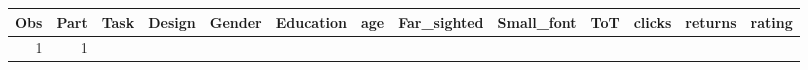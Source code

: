 \documentclass[]{svmono}
\theoremstyle{definition}
\theoremstyle{definition}
\theoremstyle{definition}
\theoremstyle{remark}
\begin{document}
\begin{longtable}[]{@{}rrllllrllrrrr@{}}
\toprule
\begin{minipage}[b]{0.03\columnwidth}\raggedleft\strut
Obs\strut
\end{minipage} & \begin{minipage}[b]{0.04\columnwidth}\raggedleft\strut
Part\strut
\end{minipage} & \begin{minipage}[b]{0.04\columnwidth}\raggedright\strut
Task\strut
\end{minipage} & \begin{minipage}[b]{0.05\columnwidth}\raggedright\strut
Design\strut
\end{minipage} & \begin{minipage}[b]{0.05\columnwidth}\raggedright\strut
Gender\strut
\end{minipage} & \begin{minipage}[b]{0.07\columnwidth}\raggedright\strut
Education\strut
\end{minipage} & \begin{minipage}[b]{0.03\columnwidth}\raggedleft\strut
age\strut
\end{minipage} & \begin{minipage}[b]{0.08\columnwidth}\raggedright\strut
Far\_sighted\strut
\end{minipage} & \begin{minipage}[b]{0.08\columnwidth}\raggedright\strut
Small\_font\strut
\end{minipage} & \begin{minipage}[b]{0.03\columnwidth}\raggedleft\strut
ToT\strut
\end{minipage} & \begin{minipage}[b]{0.05\columnwidth}\raggedleft\strut
clicks\strut
\end{minipage} & \begin{minipage}[b]{0.06\columnwidth}\raggedleft\strut
returns\strut
\end{minipage} & \begin{minipage}[b]{0.05\columnwidth}\raggedleft\strut
rating\strut
\end{minipage}\tabularnewline
\midrule
\endhead
\begin{minipage}[t]{0.03\columnwidth}\raggedleft\strut
1\strut
\end{minipage} & \begin{minipage}[t]{0.04\columnwidth}\raggedleft\strut
1\strut
\end{minipage} & \begin{minipage}[t]{0.04\columnwidth}\raggedright\strut

\end{minipage}
\end{longtable}
\end{document}
